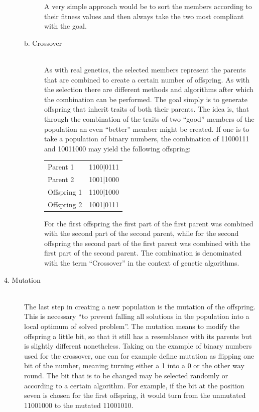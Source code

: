 \documentclass[11pt,a4paper]{article}
\begin{document}
\begin{description}
\begin{description}
A very simple approach would be to sort the members according to their fitness values and then always take the two most compliant with the goal.
\item[b. Crossover] \hfill \\
As with real genetics, the selected members represent the parents that are combined to create a certain number of offspring. As with the selection there are different methods and algorithms after which the combination can be performed. The goal simply is to generate offspring that inherit traits of both their parents. The idea is, that through the combination of the traits of two “good” members of the population an even “better” member might be created. If one is to take a population of binary numbers, the combination of 11000111 and 10011000 may yield the following offspring: \\

\begin{table}[h!]
\centering
\begin{tabular}{p{}p{}}
Parent 1  &  1100|0111\\
Parent 2  &  1001|1000\\
Offspring 1 &  1100|1000\\
Offspring 2 &  1001|0111\\
\end{tabular}
\end{table}

For the first offspring the first part of the first parent was combined with the second part of the second parent, while for the second offspring the second part of the first parent was combined with the first part of the second parent.
The combination is denominated with the term “Crossover” in the context of genetic algorithms.
\end{description}
\item[4. Mutation] \hfill \\
The last step in creating a new population is the mutation of the offspring. This is necessary 
\enquote{to prevent falling all solutions in the population into a local optimum of solved problem}\cite{Ezziane:2002:SKP:965702.965705}. The mutation means to modify the offspring a little bit, so that it still has a resemblance with its parents but is slightly different nonetheless.
Taking on the example of binary numbers used for the crossover, one can for example define mutation as flipping one bit of the number, meaning turning either a 1 into a 0 or the other way round. The bit that is to be changed may be selected randomly or according to a certain algorithm.
For example, if the bit at the position seven is chosen for the first offspring, it would turn from the unmutated 11001000 to the mutated 11001010.
\end{description}
\end{document}
